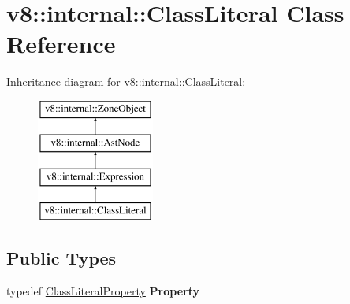 \hypertarget{classv8_1_1internal_1_1ClassLiteral}{}\section{v8\+:\+:internal\+:\+:Class\+Literal Class Reference}
\label{classv8_1_1internal_1_1ClassLiteral}
Inheritance diagram for v8\+:\+:internal\+:\+:Class\+Literal\+:\begin{figure}[H]
\begin{center}
\leavevmode
\includegraphics[height=4.000000cm]{classv8_1_1internal_1_1ClassLiteral}
\end{center}
\end{figure}
\subsection*{Public Types}
\begin{DoxyCompactItemize}
\item 
\mbox{\label{classv8_1_1internal_1_1ClassLiteral_a363b04940b2d3aae6d8bc0a0d7069246}} 
typedef \mbox{\hyperlink{classv8_1_1internal_1_1ClassLiteralProperty}{Class\+Literal\+Property}} {\bfseries Property}
\end{DoxyCompactItemize}
